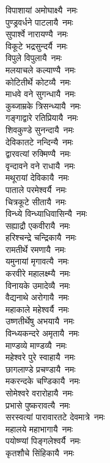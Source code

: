 \begin{multicols}{2}
\begin{flushleft}
विपाशायां अमोघाक्ष्यै~नमः\\
पुण्ड्रवर्धने पाटलायै~नमः\\
सुपार्श्वे नारायण्यै~नमः\\
विकूटे भद्रसुन्दर्यै~नमः\hfill{}\\
विपुले विपुलायै~नमः\\
मलयाचले कल्याण्यै~नमः\\
कोटितीर्थे कोटव्यै~नमः\\
माधवे वने सुगन्धायै~नमः\\
कुब्जाम्रके त्रिसन्ध्यायै~नमः\\
गङ्गाद्वारे रतिप्रियायै~नमः\\
शिवकुण्डे सुनन्दायै~नमः\\
देविकातटे नन्दिन्यै~नमः\\
द्वारवत्यां रुक्मिण्यै~नमः\\
वृन्दावने वने राधायै~नमः\hfill{}\\
मथूरायां देविकायै~नमः\\
पाताले परमेश्वर्यै~नमः\\
चित्रकूटे सीतायै~नमः\\
विन्ध्ये विन्ध्याधिवासिन्यै~नमः\\
सह्याद्रौ एकवीरायै~नमः\\
हरिश्चन्द्रे चन्द्रिकायै~नमः\\
रामतीर्थे रमणायै~नमः\\
यमुनायां मृगावत्यै~नमः\\
करवीरे महालक्ष्म्यै~नमः\\
विनायके उमादेव्यै~नमः\hfill{}\\
वैद्यनाथे अरोगायै~नमः\\
महाकाले महेश्वर्यै~नमः\\
उष्णतीर्थेषु अभयायै~नमः\\
विन्ध्यकन्दरे अमृतायै~नमः\\
माण्डव्ये माण्डव्यै~नमः\\
महेश्वरे पुरे स्वाहायै~नमः\\
छागलाण्डे प्रचण्डायै~नमः\\
मकरन्दके चण्डिकायै~नमः\\
सोमेश्वरे वरारोहायै~नमः\\
प्रभासे पुष्करावत्यै~नमः\hfill{}\\
सरस्वत्यां पारावारतटे देवमात्रे~नमः\\
महालये महाभागायै~नमः\\
पयोष्ण्यां पिङ्गलेश्वर्यै~नमः\\
कृतशौचे सिंहिकायै~नमः\\

\end{flushleft}
\end{multicols}
